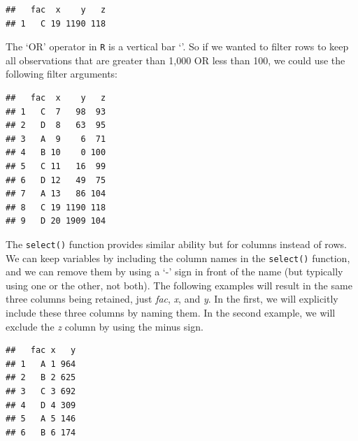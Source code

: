 \documentclass[letterpaper,]{book}
\newenvironment{Shaded}{\begin{snugshade}}{\end{snugshade}}
\newcommand{\CommentTok}[1]{\textcolor[rgb]{0.56,0.35,0.01}{\textit{#1}}}
\newcommand{\DecValTok}[1]{\textcolor[rgb]{0.00,0.00,0.81}{#1}}
\newcommand{\KeywordTok}[1]{\textcolor[rgb]{0.13,0.29,0.53}{\textbf{#1}}}
\newcommand{\NormalTok}[1]{#1}
\newcommand{\OperatorTok}[1]{\textcolor[rgb]{0.81,0.36,0.00}{\textbf{#1}}}
\newcommand{\StringTok}[1]{\textcolor[rgb]{0.31,0.60,0.02}{#1}}
\begin{document}
\begin{verbatim}
##   fac  x    y   z
## 1   C 19 1190 118
\end{verbatim}

The `OR' operator in \texttt{R} is a vertical bar `\textbar{}'. So if we wanted to filter rows to keep all observations that are greater than 1,000 OR less than 100, we could use the following filter arguments:

\begin{Shaded}
\end{Shaded}

\begin{verbatim}
##   fac  x    y   z
## 1   C  7   98  93
## 2   D  8   63  95
## 3   A  9    6  71
## 4   B 10    0 100
## 5   C 11   16  99
## 6   D 12   49  75
## 7   A 13   86 104
## 8   C 19 1190 118
## 9   D 20 1909 104
\end{verbatim}

The \texttt{select()} function provides similar ability but for columns instead of rows. We can keep variables by including the column names in the \texttt{select()} function, and we can remove them by using a `-' sign in front of the name (but typically using one or the other, not both). The following examples will result in the same three columns being retained, just \emph{fac}, \emph{x}, and \emph{y}. In the first, we will explicitly include these three columns by naming them. In the second example, we will exclude the \emph{z} column by using the minus sign.

\begin{Shaded}
\end{Shaded}

\begin{verbatim}
##   fac x   y
## 1   A 1 964
## 2   B 2 625
## 3   C 3 692
## 4   D 4 309
## 5   A 5 146
## 6   B 6 174
\end{verbatim}
\end{document}

